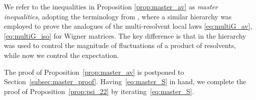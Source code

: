 \documentclass[10pt]{amsart}
\numberwithin{equation}{section}
\begin{document}
We refer to the inequalities in Proposition \ref{prop:master_av} as \emph{master inequalities}, adopting the terminology from \cite{Multi_res_llaws}, where a similar hierarchy \cite[Eq. (3.20a), (3.20b)]{Multi_res_llaws} was employed to prove the analogues of the multi-resolvent local laws \eqref{eq:multiG_av}, \eqref{eq:multiG_iso} for Wigner matrices. The key difference is that in \cite{Multi_res_llaws} the hierarchy was used to control the magnitude of fluctuations of a product of resolvents, while now we control the expectation.


The proof of Proposition~\ref{prop:master_av} is postponed to Section~\ref{subsec:master_proof}. Having~\eqref{eq:master_S} in hand, we complete the proof of Proposition~\ref{prop:psi_22} by iterating~\eqref{eq:master_S}.
\end{document}
